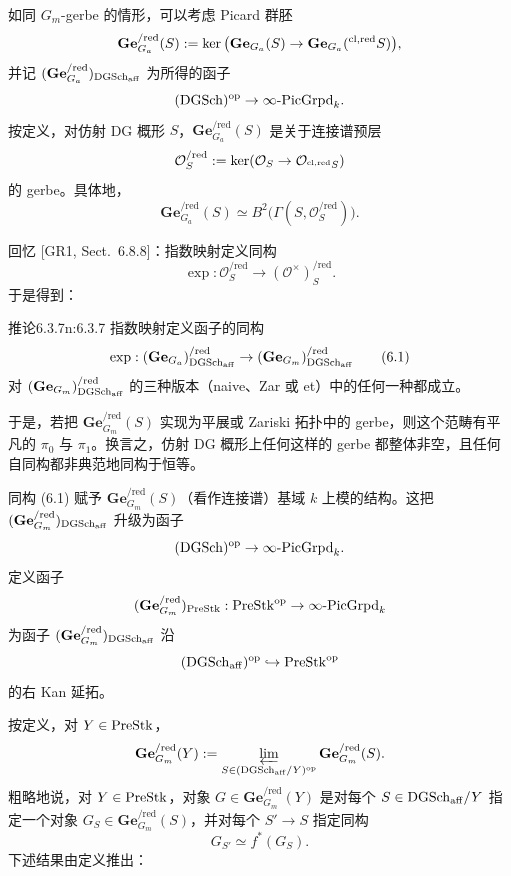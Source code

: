 如同 $G_m$-gerbe 的情形，可以考虑 Picard 群胚
\[
\mathbf{Ge}^{/\mathrm{red}}_{G_a}(S):=\ker\big(\mathbf{Ge}_{G_a}(S)\to\mathbf{Ge}_{G_a}(^{\mathrm{cl,red}} S)\big),
\]
并记 $(\mathbf{Ge}^{/\mathrm{red}}_{G_a})_{\mathrm{DGSch}_{\mathrm{aff}}}$ 为所得的函子
\[
(\mathrm{DGSch})^{\mathrm{op}}\to\infty\text{-}\mathrm{PicGrpd}_k.
\]
按定义，对仿射 DG 概形 $S$，$\mathbf{Ge}^{/\mathrm{red}}_{G_a}(S)$ 是关于连接谱预层
\[
\mathcal{O}^{/\mathrm{red}}_S:=\ker(\mathcal{O}_S\to\mathcal{O}_{^{\mathrm{cl,red}} S})
\]
的 gerbe。具体地，
\[
\mathbf{Ge}^{/\mathrm{red}}_{G_a}(S)\simeq B^2\big(\Gamma(S,\mathcal{O}^{/\mathrm{red}}_S)\big).
\]

回忆 [GR1, Sect.~6.8.8]：指数映射定义同构
\[
\exp:\mathcal{O}^{/\mathrm{red}}_S\to(\mathcal{O}^{\times})^{/\mathrm{red}}_S.
\]
于是得到：

\begin{othm}{推论}{6.3.7}{n:6.3.7}
指数映射定义函子的同构
\begin{equation}
\exp:(\mathbf{Ge}_{G_a})^{/\mathrm{red}}_{\mathrm{DGSch}_{\mathrm{aff}}}\to(\mathbf{Ge}_{G_m})^{/\mathrm{red}}_{\mathrm{DGSch}_{\mathrm{aff}}}\tag{6.1}
\end{equation}
对 $(\mathbf{Ge}_{G_m})^{/\mathrm{red}}_{\mathrm{DGSch}_{\mathrm{aff}}}$ 的三种版本（naive、Zar 或 et）中的任何一种都成立。
\end{othm}

于是，若把 $\mathbf{Ge}^{/\mathrm{red}}_{G_m}(S)$ 实现为平展或 Zariski 拓扑中的 gerbe，则这个范畴有平凡的 $\pi_0$ 与 $\pi_1$。换言之，仿射 DG 概形上任何这样的 gerbe 都整体非空，且任何自同构都非典范地同构于恒等。

同构 (6.1) 赋予 $\mathbf{Ge}^{/\mathrm{red}}_{G_m}(S)$（看作连接谱）基域 $k$ 上模的结构。这把 $(\mathbf{Ge}^{/\mathrm{red}}_{G_m})_{\mathrm{DGSch}_{\mathrm{aff}}}$ 升级为函子
\[
(\mathrm{DGSch})^{\mathrm{op}}\to\infty\text{-}\mathrm{PicGrpd}_k.
\]
定义函子
\[
(\mathbf{Ge}^{/\mathrm{red}}_{G_m})_{\mathrm{PreStk}}:\mathrm{PreStk}^{\mathrm{op}}\to\infty\text{-}\mathrm{PicGrpd}_k
\]
为函子 $(\mathbf{Ge}^{/\mathrm{red}}_{G_m})_{\mathrm{DGSch}_{\mathrm{aff}}}$ 沿
\[
(\mathrm{DGSch}_{\mathrm{aff}})^{\mathrm{op}}\hookrightarrow\mathrm{PreStk}^{\mathrm{op}}
\]
的右 Kan 延拓。

按定义，对 $Y\in\mathrm{PreStk}$，
\[
\mathbf{Ge}^{/\mathrm{red}}_{G_m}(Y):=\varprojlim_{S\in(\mathrm{DGSch}_{\mathrm{aff}}/Y)^{\mathrm{op}}}\mathbf{Ge}^{/\mathrm{red}}_{G_m}(S).
\]
粗略地说，对 $Y\in\mathrm{PreStk}$，对象 $G\in\mathbf{Ge}^{/\mathrm{red}}_{G_m}(Y)$ 是对每个 $S\in\mathrm{DGSch}_{\mathrm{aff}}/Y$ 指定一个对象 $G_S\in\mathbf{Ge}^{/\mathrm{red}}_{G_m}(S)$，并对每个 $S'\to S$ 指定同构
\[
G_{S'}\simeq f^*(G_S).
\]
下述结果由定义推出：

